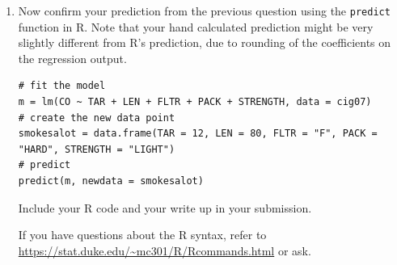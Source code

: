 \documentclass[11pt]{article}
\begin{document}
\begin{enumerate}[resume]
\item Now confirm your prediction from the previous question using the \texttt{predict} function in R. Note that your hand calculated prediction might be very slightly different from R's prediction, due to rounding of the coefficients on the regression output.
\begin{verbatim}
# fit the model
m = lm(CO ~ TAR + LEN + FLTR + PACK + STRENGTH, data = cig07)
# create the new data point
smokesalot = data.frame(TAR = 12, LEN = 80, FLTR = "F", PACK = "HARD", STRENGTH = "LIGHT")
# predict
predict(m, newdata = smokesalot)
\end{verbatim}

Include your R code and your write up in your submission. 

If you have questions about the R syntax, refer to \url{https://stat.duke.edu/~mc301/R/Rcommands.html} or ask.

 \end{enumerate}

%
\end{document}

